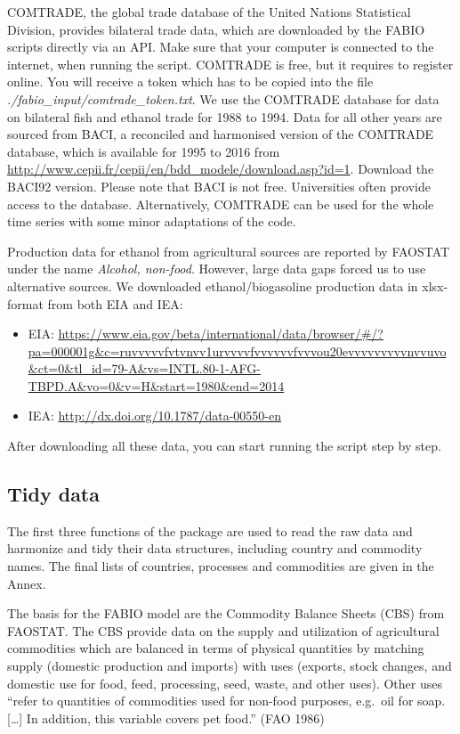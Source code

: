 \documentclass[]{article}
\begin{document}
COMTRADE, the global trade database of the United Nations Statistical
Division, provides bilateral trade data, which are downloaded by the
FABIO scripts directly via an API. Make sure that your computer is
connected to the internet, when running the script. COMTRADE is free,
but it requires to register online. You will receive a token which has
to be copied into the file \emph{./fabio\_input/comtrade\_token.txt}. We
use the COMTRADE database for data on bilateral fish and ethanol trade
for 1988 to 1994. Data for all other years are sourced from BACI, a
reconciled and harmonised version of the COMTRADE database, which is
available for 1995 to 2016 from
\url{http://www.cepii.fr/cepii/en/bdd_modele/download.asp?id=1}.
Download the BACI92 version. Please note that BACI is not free.
Universities often provide access to the database. Alternatively,
COMTRADE can be used for the whole time series with some minor
adaptations of the code.

Production data for ethanol from agricultural sources are reported by
FAOSTAT under the name \emph{Alcohol, non-food}. However, large data
gaps forced us to use alternative sources. We downloaded
ethanol/biogasoline production data in xlsx-format from both EIA and
IEA:

\begin{itemize}
\item
  EIA:
  \url{https://www.eia.gov/beta/international/data/browser/\#/?pa=000001g\&c=ruvvvvvfvtvnvv1urvvvvfvvvvvvfvvvou20evvvvvvvvvnvvuvo\&ct=0\&tl_id=79-A\&vs=INTL.80-1-AFG-TBPD.A\&vo=0\&v=H\&start=1980\&end=2014}
\item
  IEA: \url{http://dx.doi.org/10.1787/data-00550-en}
\end{itemize}

After downloading all these data, you can start running the script step
by step.

\subsection{Tidy data}\label{tidy-data}

The first three functions of the package are used to read the raw data
and harmonize and tidy their data structures, including country and
commodity names. The final lists of countries, processes and commodities
are given in the Annex.

The basis for the FABIO model are the Commodity Balance Sheets (CBS)
from FAOSTAT. The CBS provide data on the supply and utilization of
agricultural commodities which are balanced in terms of physical
quantities by matching supply (domestic production and imports) with
uses (exports, stock changes, and domestic use for food, feed,
processing, seed, waste, and other uses). Other uses ``refer to
quantities of commodities used for non-food purposes, e.g.~oil for soap.
{[}\ldots{}{]} In addition, this variable covers pet food.'' (FAO 1986)
\end{document}
